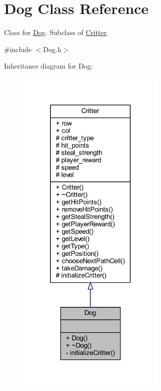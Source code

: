 \hypertarget{class_dog}{\section{Dog Class Reference}
\label{class_dog}
}


Class for \hyperlink{class_dog}{Dog}. Subclass of \hyperlink{class_critter}{Critter}.  




{\ttfamily \#include $<$Dog.\+h$>$}



Inheritance diagram for Dog\+:
\nopagebreak
\begin{figure}[H]
\begin{center}
\leavevmode
\includegraphics[width=200pt]{class_dog__inherit__graph}
\end{center}
\end{figure}


